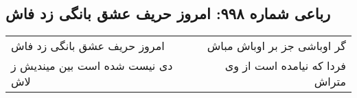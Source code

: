 \begin{center}
\section*{رباعی شماره ۹۹۸: امروز حریف عشق بانگی زد فاش}
\label{sec:0998}
\begin{longtable}{l p{0.5cm} r}
امروز حریف عشق بانگی زد فاش
&&
گر اوباشی جز بر اوباش مباش
\\
دی نیست شده است بین میندیش ز لاش
&&
فردا که نیامده است از وی متراش
\\
\end{longtable}
\end{center}
